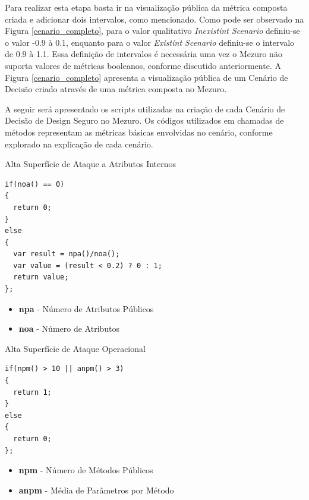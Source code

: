 Para realizar esta etapa basta ir na visualização pública da métrica composta criada e adicionar dois intervalos, como mencionado. Como pode ser observado na Figura \ref{cenario_completo}, para o valor qualitativo \emph{Inexistint Scenario} definiu-se o valor -0.9 à 0.1, enquanto para o valor \emph{Existint Scenario} definiu-se o intervalo de 0.9 à 1.1. Essa definição de intervalos é necessária uma vez o Mezuro não suporta valores de métricas booleanos, conforme discutido anteriormente. A Figura \ref{cenario_completo} apresenta a visualização pública de um Cenário de Decisão criado através de uma métrica composta no Mezuro.

A seguir será apresentado os scripts utilizadas na criação de cada Cenário de Decisão de Design Seguro no Mezuro. Os códigos utilizados em chamadas de métodos representam as métricas básicas envolvidas no cenário, conforme explorado na explicação de cada cenário.

\begin{description}
	\item[Alta Superfície de Ataque a Atributos Internos]
\end{description}

\begin{lstlisting}[caption={\emph{Script} do Cenário \emph{High Surface Attack to Internal Attributes}}, label=hsaia]
if(noa() == 0) 
{
  return 0;
}
else
{
  var result = npa()/noa();
  var value = (result < 0.2) ? 0 : 1; 
  return value;
};
\end{lstlisting}

\begin{itemize}
	\item \textbf{npa} - Número de Atributos Públicos
	\item \textbf{noa} - Número de Atributos
\end{itemize}

\begin{description}
	\item[Alta Superfície de Ataque Operacional]
\end{description}

\begin{lstlisting}[caption={\emph{Script} do Cenário \emph{High Surface Operational Attack}}, label=hsoa]
if(npm() > 10 || anpm() > 3)
{
  return 1;
}
else
{
  return 0;
};
\end{lstlisting}

\begin{itemize}
	\item \textbf{npm} - Número de Métodos Públicos
	\item \textbf{anpm} - Média de Parâmetros por Método
\end{itemize}

